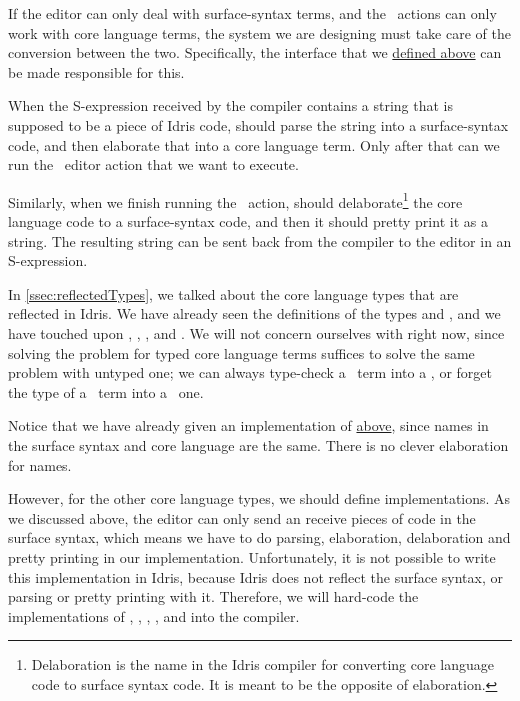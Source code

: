 If the editor can only deal with surface-syntax terms, and the \Elab\ actions
can only work with core language terms, the system we are designing must take
care of the conversion between the two.
Specifically, the  interface that we
\hyperref[code:editorable]{defined above} can be made responsible for this.

When the S-expression received by the compiler contains a string that is
supposed to be a piece of Idris code,  should parse the string
into a surface-syntax code, and then elaborate that into a core language term.
Only after that can we run the \Elab\ editor action that we want to execute.

Similarly, when we finish running the \Elab\ action,  should
delaborate\footnote{Delaboration is the name in the Idris compiler for
converting core language code to surface syntax code. It is meant to be the
opposite of elaboration.} the core language code to a surface-syntax code, and
then it should pretty print it as a string. The resulting string can be sent
back from the compiler to the editor in an S-expression.

In \autoref{ssec:reflectedTypes}, we talked about the core language types that
are reflected in Idris.  We have already seen the definitions of the types
 and , and we have touched upon , ,
, and .
We will not concern ourselves with  right now, since solving the
problem for typed core language terms suffices to solve the same problem with
untyped one; we can always type-check a \Raw\ term into a \TT, or forget the
type of a \TT\ term into a \Raw\ one.

Notice that we have already given an  implementation of
 \hyperref[code:ttnameEditorable]{above}, since names in the
surface syntax and core language are the same. There is no clever elaboration
for names.

However, for the other core language types, we should define 
implementations. As we discussed above, the editor can only send an receive
pieces of code in the surface syntax, which means we have to do parsing,
elaboration, delaboration and pretty printing in our 
implementation.
Unfortunately, it is not possible to write this implementation in Idris,
because Idris does not reflect the surface syntax, or parsing or pretty
printing with it.
Therefore, we will hard-code the implementations of , ,
, , and  into the compiler.

